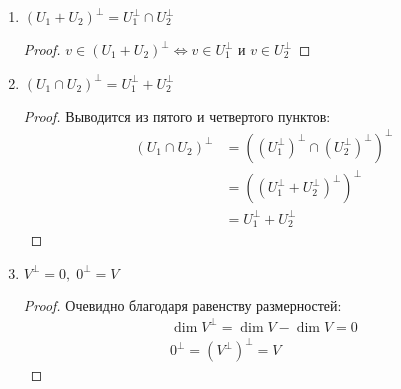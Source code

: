 \begin{theorem-non}
\begin{enumerate}
\begin{proof}
            \begin{itemize} 
                \item[``$\supset$''] Очевидно, так как любой вектор из $U$ ортогонален ко всем векторам из ортогонального дополнения по определению. 
                \item[``$\subset$''] Из второго свойства знаем, что $\dim{U^\perp} = \dim{V} - \dim{U}$. Применим это свойство еще раз и получим, что $\dim{(U^\perp)^\perp} = \dim{V} - \dim{U^\perp} = \dim{U}$
                
                Раз размерности равны, и у нас есть одно включение, то получаем равенство.
            \end{itemize}
        \end{proof}
        \item $(U_1 + U_2)^\perp = U_1^\perp \cap U_2^\perp$
        \begin{proof}
            $v \in (U_1 + U_2)^\perp \Longleftrightarrow v \in U_1^\perp$ и $v \in U_2^\perp$
        \end{proof}
        \item $(U_1 \cap U_2)^\perp = U_1^\perp + U_2^\perp$
        \begin{proof}
            Выводится из пятого и четвертого пунктов: 
            \begin{align*}
                (U_1 \cap U_2)^\perp &= \left( (U_1^\perp)^\perp \cap (U_2^\perp)^\perp \right)^\perp \\
                &= \left( (U_1^\perp + U_2^\perp)^\perp \right)^\perp \\
                &= U_1^\perp + U_2^\perp  
            \end{align*}
        \end{proof}
        \item $V^\perp = 0, \; 0^\perp = V$
        \begin{proof}
            Очевидно благодаря равенству размерностей: 
            \begin{gather*}
                \dim{V^\perp} = \dim{V} - \dim{V} = 0 \\
                0^\perp = (V^\perp)^\perp = V
            \end{gather*}
        \end{proof}
    \end{enumerate}
\end{theorem-non}